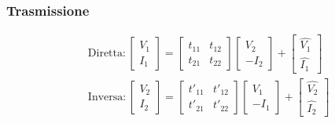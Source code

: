 \documentclass[10pt]{article}
\begin{document}
\begin{minipage}[t]{.5\textwidth}
            \subsubsection*{Trasmissione}
            \vspace{-\baselineskip}

                \begin{align*}
                    &\text{Diretta}:
                        \begin{bmatrix}
                            V_1\\
                            I_1
                        \end{bmatrix}
                        =
                        \begin{bmatrix}
                            t_{11} & t_{12}\\
                            t_{21} & t_{22}
                        \end{bmatrix}
                        \begin{bmatrix}
                            V_2\\
                            -I_2
                        \end{bmatrix}
                        +
                        \begin{bmatrix}
                            \hat{V_1}\\
                            \hat{I_1}
                        \end{bmatrix}\\
                    &\text{Inversa}:
                        \begin{bmatrix}
                            V_2\\
                            I_2
                        \end{bmatrix}
                        =
                        \begin{bmatrix}
                            t'_{11} & t'_{12}\\
                            t'_{21} & t'_{22}
                        \end{bmatrix}
                        \begin{bmatrix}
                            V_1\\
                            -I_1
                        \end{bmatrix}
                        +
                        \begin{bmatrix}
                            \hat{V_2}\\
                            \hat{I_2}
                        \end{bmatrix}
                \end{align*}

        \end{minipage}
\end{document}
